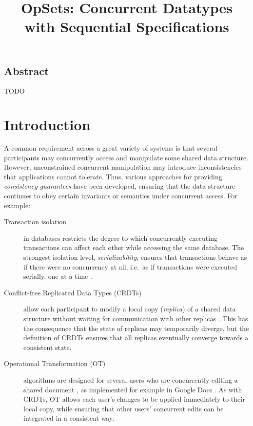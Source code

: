 \documentclass[11pt]{article}
\begin{document}
\sloppy
\title{OpSets: Concurrent Datatypes with Sequential Specifications}
\author{}
\date{}
\maketitle

\subsection*{Abstract}
TODO

\section{Introduction}

A common requirement across a great variety of systems is that several participants may concurrently access and manipulate some shared data structure.
However, unconstrained concurrent manipulation may introduce inconsistencies that applications cannot tolerate.
Thus, various approaches for providing \emph{consistency guarantees} have been developed, ensuring that the data structure continues to obey certain invariants or semantics under concurrent access. For example:

\begin{description}
\item[Transaction isolation] in databases restricts the degree to which concurrently executing transactions can affect each other while accessing the same database.
The strongest isolation level, \emph{serializability}, ensures that transactions behave as if there were no concurrency at all, i.e.\ as if transactions were executed serially, one at a time \cite{Kleppmann:2017wj}.

\item[Conflict-free Replicated Data Types (CRDTs)] allow each participant to modify a local copy (\emph{replica}) of a shared data structure without waiting for communication with other replicas \cite{Shapiro:2011wy,Shapiro:2011un}.
This has the consequence that the state of replicas may temporarily diverge, but the definition of CRDTs ensures that all replicas eventually converge towards a consistent state.

\item[Operational Transformation (OT)] algorithms are designed for several users who are concurrently editing a shared document \cite{Ellis:1989ue,Sun:1998un}, as implemented for example in Google Docs \cite{DayRichter:2010tt}.
As with CRDTs, OT allows each user's changes to be applied immediately to their local copy, while ensuring that other users' concurrent edits can be integrated in a consistent way.
\end{description}
\end{document}

